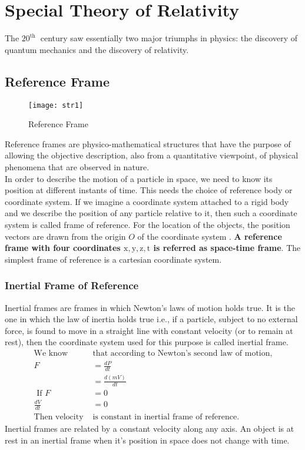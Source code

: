 \chapter{Special Theory of Relativity}
The $20^{\text{th }}$ century saw essentially two major triumphs in physics: the discovery of quantum mechanics and the discovery of relativity.
\section{Reference Frame}
\begin{wrapfigure}{r}{0.40\textwidth}
	\begin{center}
		\texttt{[image: str1]}
	\end{center}
	\caption{Reference Frame}
\end{wrapfigure}
Reference frames are physico-mathematical structures that have the purpose of allowing the objective description, also from a quantitative viewpoint, of physical phenomena that are observed in nature.\\
In order to describe the motion of a particle in space, we need to know its position at different instants of time. This needs the choice of reference body or coordinate system. If we imagine a coordinate system attached to a rigid body and we describe the position of any particle relative to it, then such a coordinate system is called frame of reference. For the location of the objects, the position vectors are drawn from the origin $O$ of the coordinate system . \textbf{A reference frame with four coordinates $\mathrm{x}, \mathrm{y}, \mathrm{z}, \mathrm{t}$ is referred as space-time frame}. The simplest frame of reference is a cartesian coordinate system. 
\subsection{Inertial Frame of Reference}
Inertial frames are frames in which Newton's laws of motion holds true.
It is the one in which the law of inertia holds true i.e., if a particle, subject to no external force, is found to move in a straight line with constant velocity (or to remain at rest), then the coordinate system used for this purpose is called inertial frame.
\begin{align*}
\text{We know }&\text{that according to  Newton's second law of motion,}\\
F&=\frac{dP}{dt}\\
&=\frac{d(mV)}{dt}\\
\text{ If }F&=0\\
\frac{dV}{dt}&=0\\
\text{Then velocity }&\text{is constant in inertial frame of reference.}
\end{align*}
Inertial frames are  related by a constant velocity along any axis.  An object is at rest in an inertial frame when it's position in space does not change with time.\\
 
